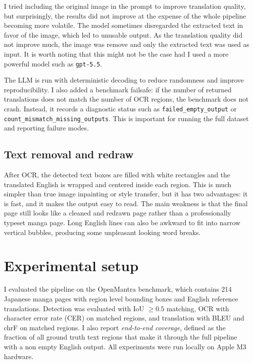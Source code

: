 \documentclass[10pt]{article}
\begin{document}
I tried including the original image in the prompt to improve translation quality, but surprisingly, the results did not improve at the expense of the whole pipeline becoming more volatile. The model sometimes disregarded the extracted text in favor of the image, which led to unusable output. As the translation quality did not improve much, the image was remove and only the extracted text was used as input. It is worth noting that this might not be the case had I used a more powerful model such as \texttt{gpt-5.5}.

The LLM is run with deterministic decoding to reduce randomness and improve reproducibility. I also added a benchmark failsafe: if the number of returned translations does not match the number of OCR regions, the benchmark does not crash. Instead, it records a diagnostic status such as \texttt{failed\_empty\_output} or \texttt{count\_mismatch\_missing\_outputs}. This is important for running the full dataset and reporting failure modes.

\subsection{Text removal and redraw}
After OCR, the detected text boxes are filled with white rectangles and the translated English is wrapped and centered inside each region. This is much simpler than true image inpainting or style transfer, but it has two advantages: it is fast, and it makes the output easy to read. The main weakness is that the final page still looks like a cleaned and redrawn page rather than a professionally typeset manga page. Long English lines can also be awkward to fit into narrow vertical bubbles, producing some unpleasant looking word breaks.

\section{Experimental setup}
I evaluated the pipeline on the OpenMantra benchmark, which contains 214 Japanese manga pages with region level bounding boxes and English reference translations. Detection was evaluated with IoU $\geq 0.5$ matching, OCR with character error rate (CER) on matched regions, and translation with BLEU and chrF on matched regions. I also report \emph{end-to-end coverage}, defined as the fraction of all ground truth text regions that make it through the full pipeline with a non empty English output. All experiments were run locally on Apple M3 hardware.
\end{document}
